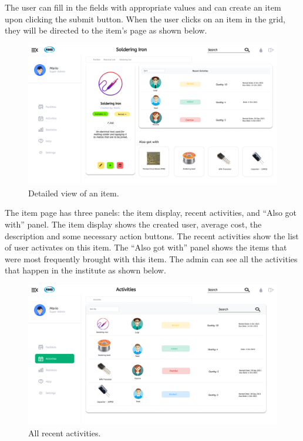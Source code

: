 The user can fill in the fields with appropriate values and can create an item upon clicking the submit button. 
\clearpage
When the user clicks on an item in the grid, they will be directed to the item’s page as shown below. 
\begin{figure}[H]
    \centering
    \includegraphics[scale=0.2]{images/Item Page.png}
    \caption{Detailed view of an item.}
    \label{fig:item}
\end{figure}
The item page has three panels: the item display, recent activities, and “Also got with” panel. The item display shows the created user, average cost, the description and some necessary action buttons. The recent activities show the list of user activates on this item. The “Also got with” panel shows the items that were most frequently brought with this item.
\clearpage
The admin can see all the activities that happen in the institute as shown below. 
\begin{figure}[H]
    \centering
    \includegraphics[scale=0.2]{images/Activities.png}
    \caption{All recent activities.}
    \label{fig:activities}
\end{figure}